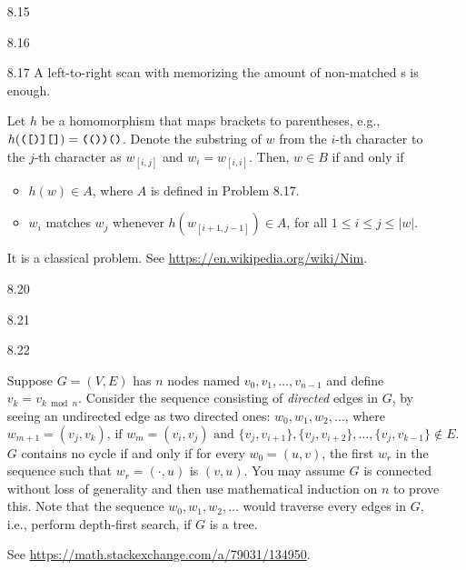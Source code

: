 \begin{itemize}
	\item[8.15]
	\Empty
	
	\item[8.16]
	\Empty
	
	\item[8.17]
	A left-to-right scan with memorizing the amount of non-matched \TT{(}s is enough.
	
	\item[\Star 8.18] 
	Let $h$ be a homomorphism that maps brackets to parentheses, e.g., $h(\texttt{([)][]}) = \texttt{(())()}$. Denote the substring of $w$ from the $i$-th character to the $j$-th character as $w_{[i,j]}$ and $w_i = w_{[i,i]}$. Then, $w \in B$ if and only if
	\begin{itemize}
		\item $h(w) \in A$, where $A$ is defined in Problem 8.17.
		\item $w_i$ matches $w_j$ whenever $h(w_{[i+1,j-1]}) \in A$, for all $1 \leq i \leq j \leq |w|$.
	\end{itemize}

	\item[\Star 8.19] 
	It is a classical problem. See \url{https://en.wikipedia.org/wiki/Nim}. 
	
	\item[8.20]
	\Empty
	
	\item[8.21]
	\Empty
	
	\item[8.22]
	\Empty
	
	\item[\Star 8.23]
	Suppose $G = (V, E)$ has $n$ nodes named $v_0, v_1, \dots, v_{n-1}$ and define $v_k = v_{k \bmod n}$. Consider the sequence consisting of \emph{directed} edges in $G$, by seeing an undirected edge as two directed ones: $w_0, w_1, w_2, \dots$, where
	$$
		w_{m+1} = (v_j, v_k) \text{, if $w_m = (v_i, v_j)$ and $\{v_j, v_{i+1}\}, \{v_j, v_{i+2}\}, \dots, \{v_j, v_{k-1}\} \notin E$.}
	$$
	$G$ contains no cycle if and only if for every $w_0 = (u, v)$, the first $w_r$ in the sequence such that $w_r = (\cdot, u)$ is $(v, u)$. You may assume $G$ is connected without loss of generality and then use mathematical induction on $n$ to prove this. Note that the sequence $w_0, w_1, w_2, \dots$ would traverse every edges in $G$, i.e., perform depth-first search, if $G$ is a tree.
	
	\item[\Star 8.24]
	See \url{https://math.stackexchange.com/a/79031/134950}.
	

\end{itemize}
